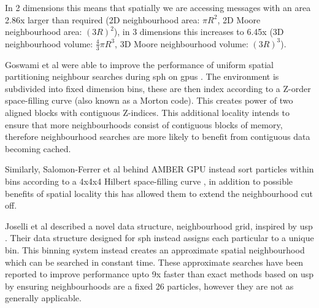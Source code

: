 In 2 dimensions this means that spatially we are accessing messages with an area 2.86x larger than required (2D neighbourhood area: $\pi R^{2}$, 2D Moore neighbourhood area: $(3R)^{2}$), in 3 dimensions this increases to 6.45x (3D neighbourhood volume: $\frac{4}{3}\pi R^{3}$, 3D Moore neighbourhood volume: $(3R)^{3}$).

Goswami et al were able to improve the performance of uniform spatial partitioning neighbour searches during \gls{sph} on \glspl{gpu} \cite{GS*10}. The environment is subdivided into fixed dimension bins, these are then index according to a Z-order space-filling curve (also known as a Morton code). This creates power of two aligned blocks with contiguous Z-indices. This additional locality intends to ensure that more neighbourhoods consist of contiguous blocks of memory, therefore neighbourhood searches are more likely to benefit from contiguous data becoming cached.

Similarly, Salomon-Ferrer et al behind AMBER GPU instead sort particles within bins according to a 4x4x4 Hilbert space-filling curve \cite{SG*13}, in addition to possible benefits of spatial locality this has allowed them to extend the neighbourhood cut off.

Joselli et al described a novel data structure, neighbourhood grid, inspired by \gls{usp} \cite{JR*15}. Their data structure designed for \gls{sph} instead assigns each particular to a unique bin. This binning system instead creates an approximate spatial neighbourhood which can be searched in constant time. These approximate searches have been reported to improve performance upto 9x faster than exact methods based on \gls{usp} by ensuring neighbourhoods are a fixed 26 particles, however they are not as generally applicable.